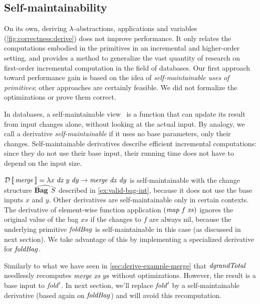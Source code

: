 
\subsection{Self-maintainability}
\label{sec:performance-cons}
\label{ssec:self-maint}

\begin{oldSec}
On its own, deriving $\lambda$-abstractions, applications and
variables (\cref{fig:correctness:derive}) does not improve performance.
It only relates the computations embodied in the primitives in
an incremental and higher-order setting, and provides a method to
generalize the vast quantity of research on first-order incremental
computation in the field of databases.
Our first approach toward performance gain is based on the idea of \emph{self-maintainable uses of primitives};
other approaches are certainly feasible. We did not formalize the
optimizations or prove them correct.
\end{oldSec}

In databases, a self-maintainable view~\citep{Gupta99MMV} is a function that can
update its result from input changes alone, without looking at
the actual input. By analogy, we call a derivative
\emph{self-maintainable} if it uses no
base parameters, only their changes. Self-maintainable derivatives
describe efficient incremental computations: since they do not
use their base input, their running time does not have to depend on the input
size.

\begin{examples}
$\Derive{\MERGE} = \Lam {x\; \D x\; y \; \D y}{\Merge{\D x}{\D y}}$
is self-maintainable with the
change structure $\ChangeStruct{\Bag{S}}$ described in
\cref{ex:valid-bag-int}, because it does not use the base
inputs $x$ and $y$.
Other derivatives are self-maintainable only in certain contexts.
The derivative of element-wise function application
$\App*{\App\MAP f}{\mathit{xs}}$ ignores the original
value of the bag $\mathit{xs}$ if the changes to
%
$f$ are always nil, because the underlying primitive $\mathit{foldBag}$
is self-maintainable in this case (as discussed in next section).
%
We take advantage of this by implementing a specialized
derivative for $\mathit{foldBag}$.

Similarly to what we have seen in \cref{sec:derive-example-merge} that $\mathit{dgrandTotal}$
needlessly recomputes $\Merge\Xs\Ys$ without optimizations. However, the result is a
base input to $\mathit{fold}'$.
%
In next section, we'll replace $\mathit{fold}'$ by a self-maintainable
derivative (based again on $\mathit{foldBag}$) and will avoid this
recomputation.
\end{examples}


